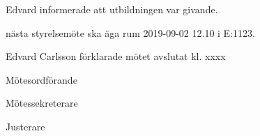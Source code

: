 \documentclass[10pt]{article}
\def\mo{Edvard Carlsson}
\def\ms{Mattias Lundström}
\def\ji{-----}
\begin{document}
\begin{paragrafer}
\begin{paragrafer}
 




\end{paragrafer}

Edvard informerade att utbildningen var givande. 






\Mba nästa styrelsemöte ska äga rum 2019-09-02 12.10 i E:1123.





{\mo} förklarade mötet avslutat kl. xxxx
\end{paragrafer}

\hidesignfoot
\begin{signatures}{3}
\signature{\mo}{Mötesordförande}
\signature{\ms}{Mötessekreterare}
\signature{\ji}{Justerare}
\end{signatures}
\end{document}
